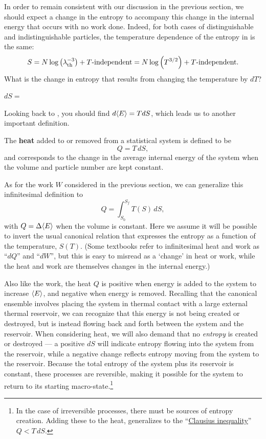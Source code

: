 In order to remain consistent with our discussion in the previous section, we should expect a change in the entropy to accompany this change in the internal energy that occurs with no work done.
Indeed, for both cases of distinguishable and indistinguishable particles, the temperature dependence of the entropy in  is the same:
\begin{equation*}
  S = N\log\left(\lambda_{\mathrm{th}}^{-3}\right) + T\mbox{-independent} = N\log\left(T^{3 / 2}\right) + T\mbox{-independent}.
\end{equation*}
What is the change in entropy that results from changing the temperature by $dT$?
\begin{mdframed}
  $\displaystyle dS = $ \\[50 pt]
\end{mdframed}
Looking back to , you should find $d\!\left\langle E \right\rangle = T dS$, which leads us to another important definition.

\begin{shaded}
  The \textbf{heat} added to or removed from a statistical system is defined to be
  \begin{equation}
    \label{eq:heat_def}
    Q = T \, dS,
  \end{equation}
  and corresponds to the change in the average internal energy of the system when the volume and particle number are kept constant.
\end{shaded}

As for the work $W$ considered in the previous section, we can generalize this infinitesimal definition to
\begin{equation}
  \label{eq:heat}
  Q = \int_{S_0}^{S_f} T(S) \, dS,
\end{equation}
with $Q = \Delta\!\left\langle E \right\rangle$ when the volume is constant.
Here we assume it will be possible to invert the usual canonical relation that expresses the entropy as a function of the temperature, $S(T)$.
(Some textbooks refer to infinitesimal heat and work as ``$dQ$'' and ``$dW$'', but this is easy to misread as a `change' in heat or work, while the heat and work are themselves changes in the internal energy.)

Also like the work, the heat $Q$ is positive when energy is added to the system to increase $\left\langle E \right\rangle$, and negative when energy is removed.
Recalling that the canonical ensemble involves placing the system in thermal contact with a large external thermal reservoir, we can recognize that this energy is not being created or destroyed, but is instead flowing back and forth between the system and the reservoir.
When considering heat, we will also demand that no \emph{entropy} is created or destroyed --- a positive $dS$ will indicate entropy flowing into the system from the reservoir, while a negative change reflects entropy moving from the system to the reservoir.
Because the total entropy of the system plus its reservoir is constant, these processes are reversible, making it possible for the system to return to its starting macro-state.\footnote{In the case of irreversible processes, there must be sources of entropy creation.  Adding these to the heat,  generalizes to the ``\href{https://en.wikipedia.org/wiki/Clausius_theorem}{Clausius inequality}'' $Q < T \, dS$.}

